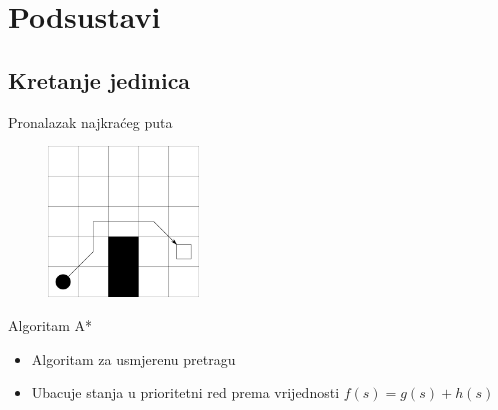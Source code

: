 \documentclass[utf8]{beamer}
\begin{document}
\section{Podsustavi}

\subsection{Kretanje jedinica}

\begin{frame}{Pronalazak najkraćeg puta}
    \begin{figure}[h] 
        \centering
        \includegraphics[height=4cm]{images/basicGrid.pdf}
    \end{figure} 
\end{frame}

\begin{frame}{Algoritam A*}
    \begin{itemize}
        \item Algoritam za usmjerenu pretragu
        \item Ubacuje stanja u prioritetni red prema vrijednosti \(f(s) = g(s) + h(s)\)
    \end{itemize}
\end{frame}
\end{document}
